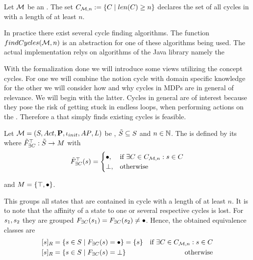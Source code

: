 \documentclass[preview]{standalone}
\begin{document}
\begin{definition}
	Let ${{{\mathcal{M}}}}$ be an \chgphN. The set ${{C}_{{{\mathcal{M}}}, n}} := \{ {C} \mid {len}({C}) \geq n\}$ declares the set of all cycles in \chgph with a length of at least $n$.
\end{definition}

In practice there exist several cycle finding algorithms. The function ${findCycles}({{{\mathcal{M}}}}, n)$ is an abstraction for one of these algorithms being used. The actual implementation relys on algorithms of the Java library \jgrapht \cite{Michail2020} namely the 

With the formalization done we will introduce some views utilizing the concept cycles. For one we will combine the notion cycle with domain specific knowledge for the other we will consider how and why cycles in MDPs are in general of relevance. We will begin with the latter.  Cycles in general are of interest because they pose the risk of getting stuck in endless loops, when performing actions on the \mdpN.  Therefore a \viewN that simply finds existing cycles is feasible.


\begin{definition}
	Let ${{{\mathcal{M}}}} = {{({S}, {Act}, {\textbf{P}}, {\iota_{init}}, {AP}, {L})}}$ be \achgphN, ${\tilde{{S}}} \subseteq {S}$ and $n \in {\mathbb{N}}$. The \viewN \viewhascycle is defined by its \grpfctN \gfcthascycle where ${{\tilde{F}_{{\exists{C}}}}^{\top}} : {\tilde{{S}}} \to {\ensuremath{{M}}}$ with
	\[
	\gfctsubhascycle(\state) =
	\begin{cases}
			\remelem, &\text{if } \exists \cycle \in \cycleset : \state \in \cycle \\
			\notppty, &\text{otherwise}
		\end{cases}
	\]
	
	and ${{M}} = \{{\top}, {\bullet}\}$.
\end{definition}

This \viewN groups all states that are contained in cycle with a length of at least $n$. It is to note that the affinity of a state to one or several respective cycles is lost. For ${s}_1, {s}_2$ they are grouped ${{F_{{\exists{C}}}}}({s}_1) = {{F_{{\exists{C}}}}}({s}_2) \neq {\bullet}$. Hence, the obtained equivalence classes are
\begin{align*}
	\eqclassv &= \{\state \in \states \mid \gfcthascycle(\state) = \remelem\} = \{\state\} &\text{if } \exists \cycle \in \cycleset : \state \in \cycle \\
	\eqclassv &= \{\state \in \states \mid \gfcthascycle(\state) = \notppty\} &\text{otherwise}
\end{align*}
\end{document}

